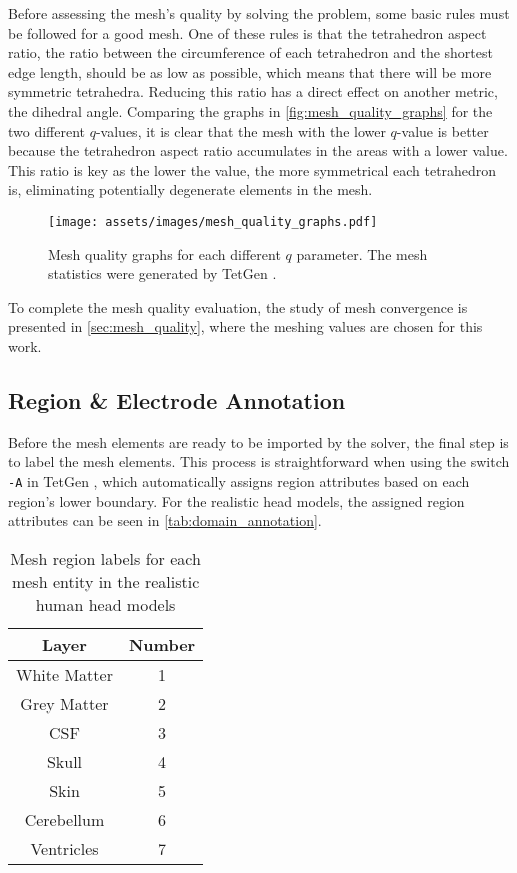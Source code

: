 Before assessing the mesh's quality by solving the problem, some basic rules must be followed for a good mesh. One of these rules is that the \gls{tetrahedron aspect ratio}, the ratio between the circumference of each tetrahedron and the shortest edge length, should be as low as possible, which means that there will be more symmetric tetrahedra. Reducing this ratio has a direct effect on another metric, the dihedral angle. Comparing the graphs in \autoref{fig:mesh_quality_graphs} for the two different $q$-values, it is clear that the mesh with the lower $q$-value is better because the \gls{tetrahedron aspect ratio} accumulates in the areas with a lower value. This ratio is key as the lower the value, the more symmetrical each tetrahedron is, eliminating potentially degenerate elements in the mesh.

\begin{figure}[H]
    \centering
    \texttt{[image: assets/images/mesh\_quality\_graphs.pdf]}
    \caption[Mesh quality graphs for each different $q$ parameter]{Mesh quality graphs for each different $q$ parameter. The mesh statistics were generated by TetGen \cite{tetgen}.}
    \label{fig:mesh_quality_graphs}
\end{figure}

To complete the mesh quality evaluation, the study of mesh convergence is presented in \autoref{sec:mesh_quality}, where the meshing values are chosen for this work.

\subsection{Region \& Electrode Annotation}
\label{subsec:elec_annotation}

Before the mesh elements are ready to be imported by the solver, the final step is to label the mesh elements. This process is straightforward when using the switch \texttt{-A} in TetGen \cite{tetgen}, which automatically assigns region attributes based on each region's lower boundary. For the realistic head models, the assigned region attributes can be seen in \autoref{tab:domain_annotation}.

\begin{table}[!ht]
	\centering
	\caption{Mesh region labels for each mesh entity in the realistic human head models}
	\label{tab:domain_annotation}
	\begin{tabular}{|c|c|}
		\hline
		\rowcolor[HTML]{C0C0C0} 
		{\color[HTML]{000000} \textbf{Layer}} & {\color[HTML]{000000} \textbf{Number}} \\ \hline
		White Matter & 1 \\ \hline
		Grey Matter & 2 \\ \hline
		\gls{CSF} & 3 \\ \hline
		Skull & 4 \\ \hline
		Skin & 5 \\ \hline
		Cerebellum & 6 \\ \hline
		Ventricles & 7 \\ \hline
	\end{tabular}
\end{table}

